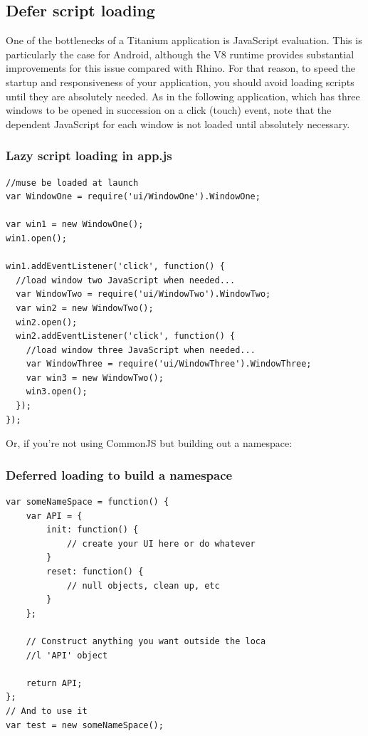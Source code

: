 \documentclass[11pt]{book}
\begin{document}
\subsection{Defer script loading}
One of the bottlenecks of a Titanium application is JavaScript evaluation. This is particularly the case for Android, although the V8 runtime provides substantial improvements for this issue compared with Rhino. For that reason, to speed the startup and responsiveness of your application, you should avoid loading scripts until they are absolutely needed. As in the following application, which has three windows to be opened in succession on a click (touch) event, note that the dependent JavaScript for each window is not loaded until absolutely necessary.

\subsubsection{Lazy script loading in app.js}
\begin{lstlisting}[frame=single]
//muse be loaded at launch
var WindowOne = require('ui/WindowOne').WindowOne;

var win1 = new WindowOne();
win1.open();

win1.addEventListener('click', function() {
  //load window two JavaScript when needed...
  var WindowTwo = require('ui/WindowTwo').WindowTwo;
  var win2 = new WindowTwo();
  win2.open();
  win2.addEventListener('click', function() {
    //load window three JavaScript when needed...
    var WindowThree = require('ui/WindowThree').WindowThree;
    var win3 = new WindowTwo();
    win3.open();
  });
});
\end{lstlisting}

Or, if you're not using CommonJS but building out a namespace:
\subsubsection{Deferred loading to build a namespace}
\begin{lstlisting}[frame=single]
var someNameSpace = function() {
    var API = {
        init: function() {
            // create your UI here or do whatever
        }
        reset: function() {
            // null objects, clean up, etc
        }
    };

    // Construct anything you want outside the loca
    //l 'API' object

    return API;
};
// And to use it
var test = new someNameSpace();
\end{lstlisting}
\end{document}
